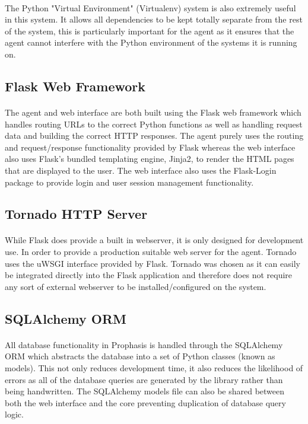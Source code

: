 \documentclass[bsc,logo,twoside]{infthesis}
\begin{document}
\paragraph*{}
	The Python "Virtual Environment" (Virtualenv) system is also extremely useful
	in this system.  It allows all dependencies to be kept totally separate from
	the rest of the system, this is particularly important for the agent as it
	ensures that the agent cannot interfere with the Python environment of the
	systems it is running on.
	
\subsection{Flask Web Framework}
\paragraph*{}
	The agent and web interface are both built using the Flask web framework which
	handles routing URLs to the correct Python functions as well as handling request
	data and building the correct HTTP responses. The agent purely uses the routing
	and request/response functionality provided by Flask whereas the web interface
	also uses Flask's bundled templating engine, Jinja2, to render the HTML pages
	that are displayed to the user. The web interface also uses the Flask-Login
	package to provide login and user session management functionality.
	
\subsection{Tornado HTTP Server}
\paragraph*{}
	While Flask does provide a built in webserver, it is only designed for
	development	use.  In order to provide a production suitable web server for the
	agent.  Tornado uses the uWSGI interface provided by Flask.  Tornado was
	chosen as it can easily be integrated directly into the Flask application and
	therefore does not require any sort of external webserver to be
	installed/configured on the system.
	
\subsection{SQLAlchemy ORM}
\paragraph*{}
	All database functionality in Prophasis is handled through the SQLAlchemy ORM
	which abstracts the database into a set of Python classes (known as models). 
	This not only reduces development time, it also reduces the likelihood of
	errors as all of the database queries are generated by the library rather than
	being handwritten.  The SQLAlchemy models file can also be shared between both
	the web interface and the core preventing duplication of database query logic.
	
\end{document}
